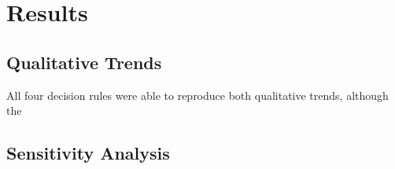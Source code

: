 \section{Results}
\label{sec:results}

\subsection{Qualitative Trends}
\label{sub:qt_results}

All four decision rules were able to reproduce both qualitative trends, although the

\subsection{Sensitivity Analysis}
\label{sub:sa_results}

